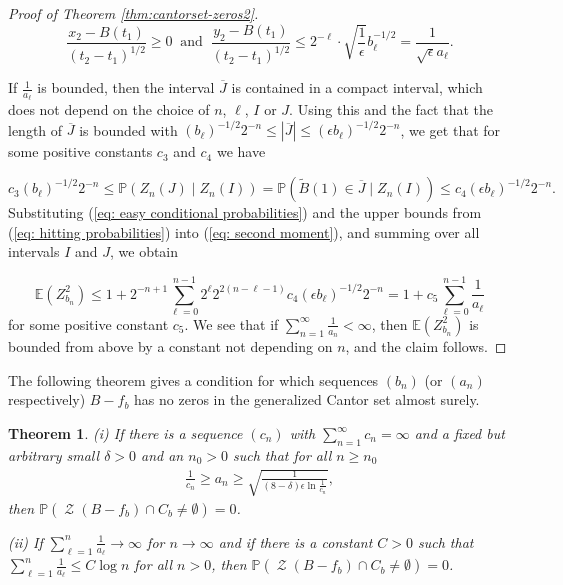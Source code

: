 \documentclass[11pt,reqno]{amsart}
\theoremstyle{plain}
\newtheorem{theorem}{Theorem}[section]
\theoremstyle{definition}
\theoremstyle{remark}
\begin{document}
\begin{proof}[Proof of Theorem \ref{thm:cantorset-zeros2}]
\[\frac{x_2-B(t_1)}{(t_2-t_1)^{1/2}} \geq 0 \ \text{ and } \  \frac{y_2-B(t_1)}{(t_2-t_1)^{1/2}} \leq 2^{-\ell}\cdot \sqrt{\frac{1}{\epsilon}}b_\ell^{-1/2} = \frac{1}{\sqrt{\epsilon} a_\ell}.\]

If $\frac{1}{a_\ell}$ is bounded, then the interval $\overline{J}$ is contained in a compact interval, which does not depend on the choice of $n$, $\ell$, $I$ or $J$. Using this and the fact that the length of $\overline{J}$ is bounded
with $ (b_\ell)^{-1/2}2^{-n} \leq |\overline{J}| \leq (\epsilon b_\ell)^{-1/2}2^{-n}$,  we get that for some positive constants $c_3$ and $c_4$ we have

\begin{equation}\label{eq: easy conditional probabilities}
c_3(b_\ell)^{-1/2}2^{-n} \leq \mathbb{P}(Z_n(J) \mid Z_n(I)) = \mathbb{P}(\widetilde{B}(1) \in \overline{J} \mid Z_n(I)) \leq c_4 (\epsilon b_\ell)^{-1/2}2^{-n}.
\end{equation}
Substituting  (\ref{eq: easy conditional probabilities}) and the upper bounds from (\ref{eq: hitting probabilities}) into (\ref{eq: second moment}), and summing over all intervals $I$ and $J$, we obtain

\[
\mathbb{E}(Z_{b_n}^2) \leq 1 + 2^{-n+1}\sum_{\ell=0}^{n-1}2^\ell2^{2(n-\ell-1)}c_4 (\epsilon b_\ell)^{-1/2}2^{-n} = 1 + c_5\sum_{\ell=0}^{n-1} \frac{1}{a_\ell}
\]
for some positive constant $c_5$.
We see that if $\sum_{n=1}^{\infty} \frac{1}{a_n} < \infty$, then $\mathbb{E}(Z_{b_n}^2)$ is bounded from above by a constant not depending on $n$, and the claim follows.

\end{proof}

The following theorem gives a condition for which sequences $(b_n)$ (or $(a_n)$ respectively) $B-f_b$ has no zeros in the generalized Cantor set almost surely.

\begin{theorem}\label{thm: cantorset-zeros 2nd part}
(i) If there is a sequence $(c_n)$ with $\sum_{n=1}^{\infty} c_n = \infty$ and a fixed but arbitrary small $\delta > 0$  and an $n_0>0$ such that for all $n \geq n_0$
\begin{align}\label{inequality of thm: cantorset-zeros 2nd part}
\frac{1}{c_n}\geq a_n \geq \sqrt{\frac{1}{(8-\delta)\epsilon\ln{\frac{1}{c_n}}}},
\end{align}
then $\mathbb{P}(\operatorname{\mathcal{Z}}(B-f_b) \cap C_b \neq \emptyset)=0$.

(ii) If $\sum_{\ell = 1}^n \frac{1}{a_\ell} \rightarrow \infty$ for $n \rightarrow \infty$ and if there is a constant $C>0$ such that $\sum_{\ell = 1}^n \frac{1}{a_\ell} \leq C \log n$ for all $n>0$, then $\mathbb{P}(\operatorname{\mathcal{Z}}(B-f_b) \cap C_b \neq \emptyset)=0$.

\end{theorem}
\end{document}
